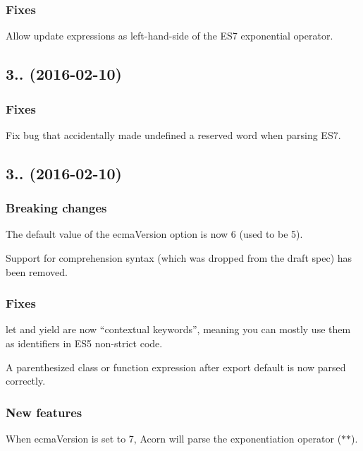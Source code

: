 \subsubsection*{Fixes}

Allow update expressions as left-\/hand-\/side of the E\+S7 exponential operator.

\subsection*{3.. (2016-\/02-\/10)}

\subsubsection*{Fixes}

Fix bug that accidentally made {\ttfamily undefined} a reserved word when parsing E\+S7.

\subsection*{3.. (2016-\/02-\/10)}

\subsubsection*{Breaking changes}

The default value of the {\ttfamily ecma\+Version} option is now 6 (used to be 5).

Support for comprehension syntax (which was dropped from the draft spec) has been removed.

\subsubsection*{Fixes}

{\ttfamily let} and {\ttfamily yield} are now “contextual keywords”, meaning you can mostly use them as identifiers in E\+S5 non-\/strict code.

A parenthesized class or function expression after {\ttfamily export default} is now parsed correctly.

\subsubsection*{New features}

When {\ttfamily ecma\+Version} is set to 7, Acorn will parse the exponentiation operator ({\ttfamily $\ast$$\ast$}).

